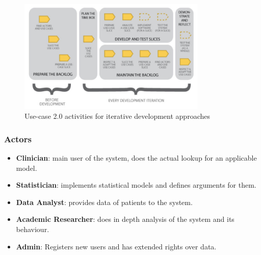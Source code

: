 {\begin{figure}[!ht]
\centering
\includegraphics[width=0.8\textwidth]{figures/uc20_flow}
\caption{Use-case 2.0 activities for iterative development approaches}
\label{fig:usecase20:flow}
\end{figure}


\subsubsection{Actors}
\label{sub:sassoon:actors}
\begin{itemize}
	\item \textbf{Clinician}: main user of the system, does the actual lookup for an applicable model.
	\item \textbf{Statistician}: implements statistical models and defines arguments for them.
	\item \textbf{Data Analyst}: provides data of patients to the system.
	\item \textbf{Academic Researcher}: does in depth analysis of the system and its behaviour.
	\item \textbf{Admin}: Registers new users and has extended rights over data.
\end{itemize}
}